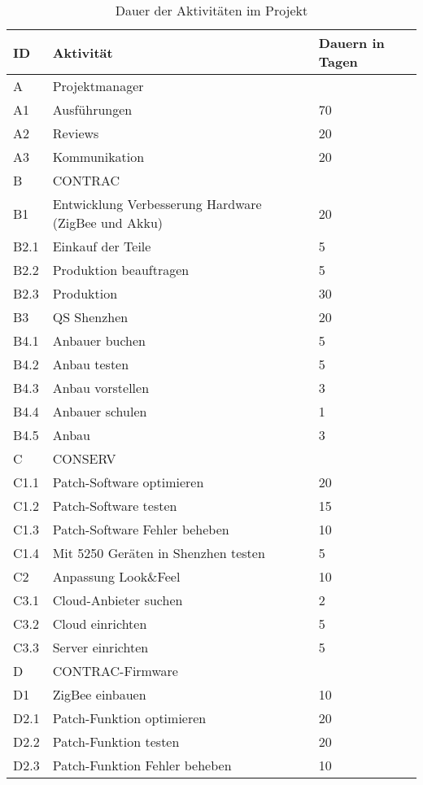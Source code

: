 \begin{table}[H]
	\renewcommand{\arraystretch}{1.05}
	\begin{center}
		\begin{tabular}{l|l|l}
			\hline
			\textbf{ID} & \textbf{Aktivität} & \textbf{Dauern in Tagen}\\\hline
			A    & Projektmanager &  \\ \hline
			A1   & Ausführungen & 70 \\  \hline
			A2   & Reviews & 20 \\ \hline
			A3 & Kommunikation & 20 \\\hline
			B    & CONTRAC & \\ \hline
			B1   & Entwicklung Verbesserung Hardware (ZigBee und Akku) & 20\\ \hline
			B2.1 & Einkauf der Teile & 5\\\hline
			B2.2 & Produktion beauftragen & 5\\ \hline
			B2.3 & Produktion & 30\\ \hline
			B3 & QS Shenzhen & 20\\ \hline
			B4.1 & Anbauer buchen & 5\\ \hline
			B4.2 & Anbau testen &5\\ \hline
			B4.3 & Anbau vorstellen &3\\ \hline
			B4.4 & Anbauer schulen &1\\ \hline
			B4.5 & Anbau &3\\ \hline
			C    & CONSERV &\\ \hline
			C1.1 & Patch-Software optimieren & 20\\ \hline
			C1.2 & Patch-Software testen  & 15 \\ \hline
			C1.3 & Patch-Software Fehler beheben  & 10\\ \hline
			C1.4  & Mit 5250 Geräten in Shenzhen testen  & 5\\ \hline
			C2 & Anpassung Look\&Feel  & 10\\\hline
			C3.1 & Cloud-Anbieter suchen  & 2\\ \hline
			C3.2 & Cloud einrichten       & 5\\ \hline
			C3.3 & Server einrichten      & 5\\ \hline
			D    & CONTRAC-Firmware      & \\ \hline
			D1   & ZigBee einbauen       & 10 \\ \hline
			D2.1 & Patch-Funktion optimieren & 20 \\ \hline
			D2.2 & Patch-Funktion testen & 20 \\ \hline
			D2.3 & Patch-Funktion Fehler beheben  & 10 \\
		\end{tabular}
		\caption{Dauer der Aktivitäten im Projekt}
	\end{center}
\end{table}

